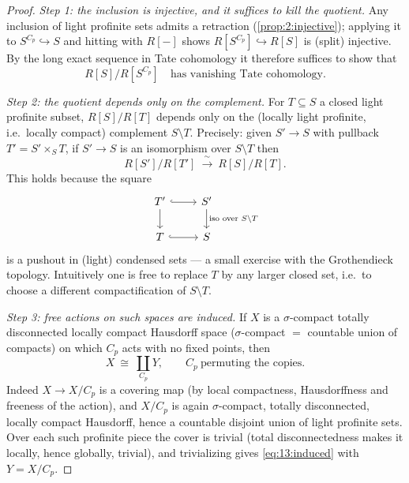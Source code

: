 \begin{proof}
\emph{Step 1: the inclusion is injective, and it suffices to kill the quotient.}
Any inclusion of light profinite sets admits a retraction
(\cref{prop:2:injective}); applying it to $S^{C_p}\hookrightarrow S$ and hitting
with $R[-]$ shows $R[S^{C_p}]\hookrightarrow R[S]$ is (split) injective. By the
long exact sequence in Tate cohomology it therefore suffices to show that
\begin{equation}
\label{eq:13:quotient-vanishes}
R[S]\big/R[S^{C_p}]\quad\text{has vanishing Tate cohomology.}
\end{equation}

\emph{Step 2: the quotient depends only on the complement.} For $T\subseteq S$ a
closed light profinite subset, $R[S]/R[T]$ depends only on the (locally light
profinite, i.e.\ locally compact) complement $S\setminus T$. Precisely: given
$S'\to S$ with pullback $T'=S'\times_S T$, if $S'\to S$ is an isomorphism over
$S\setminus T$ then
\begin{equation*}
R[S']\big/R[T']\ \xrightarrow{\ \sim\ }\ R[S]\big/R[T].
\end{equation*}
This holds because the square
\begin{equation*}
\begin{tikzcd}
T' \arrow[r, hook] \arrow[d] & S' \arrow[d, "\text{iso over }S\setminus T"] \\
T \arrow[r, hook] & S
\end{tikzcd}
\end{equation*}
is a pushout in (light) condensed sets --- a small exercise with the Grothendieck
topology. Intuitively one is free to replace $T$ by any larger closed set, i.e.\
to choose a different compactification of $S\setminus T$.

\emph{Step 3: free actions on such spaces are induced.} If $X$ is a
$\sigma$-compact totally disconnected locally compact Hausdorff space
($\sigma$-compact $=$ countable union of compacts) on which $C_p$ acts with no
fixed points, then
\begin{equation}
\label{eq:13:induced}
X\ \cong\ \coprod_{C_p} Y,\qquad C_p\ \text{permuting the copies.}
\end{equation}
Indeed $X\to X/C_p$ is a covering map (by local compactness, Hausdorffness and
freeness of the action), and $X/C_p$ is again $\sigma$-compact, totally
disconnected, locally compact Hausdorff, hence a countable disjoint union of
light profinite sets. Over each such profinite piece the cover is trivial (total
disconnectedness makes it locally, hence globally, trivial), and trivializing
gives \eqref{eq:13:induced} with $Y=X/C_p$.


\end{proof}
